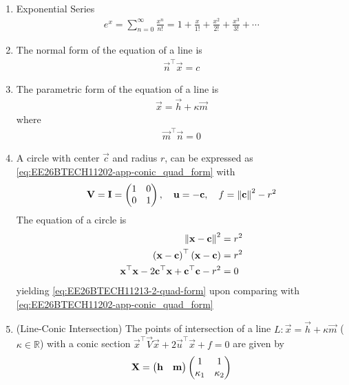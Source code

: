 \begin{enumerate}[label=\thesubsection.\arabic*, ref=\thesubsection.\theenumi,itemsep=0pt]

\item Exponential Series
\begin{align}
e^x = \sum_{n=0}^{\infty} \frac{x^n}{n!} = 1 + \frac{x}{1!} + \frac{x^2}{2!} + \frac{x^3}{3!} + \cdots \label{eq:EE26BTECH11213-exp_maclaurin}
\end{align}
\item The normal form of the equation of a line is 
\begin{align}
	\vec{n}^{\top}
\vec{x} = c
\label{eq:EE26BTECH11213-line-normal}
\end{align}
\item The parametric form of the equation of a line is 
\begin{align}
\vec{x} = \vec{h}+ \kappa \vec{m}
\label{eq:EE26BTECH11213-line-param}
\end{align}
where
\begin{align}
\vec{m}^\top \vec{n} = 0
\end{align}
\item A circle with center $\vec{c}$ and radius $r$, 
	can be expressed as
    \eqref{eq:EE26BTECH11202-app-conic_quad_form}
    with 
\begin{align}
\mathbf{V} = \mathbf{I} = \begin{pmatrix}1 & 0 \\ 0 & 1\end{pmatrix}, \quad \mathbf{u} = -\mathbf{c}, \quad f = \left\lVert\mathbf{c}\right\rVert^2 - r^2 
\label{eq:EE26BTECH11213-2-quad-form}
\end{align}
\solution  The equation of a circle is
\begin{align}
	\left\lVert\mathbf{x} - \mathbf{c}\right\rVert^2 &= r^2
\\
\left(\mathbf{x} - \mathbf{c}\right)^\top \left(\mathbf{x} - \mathbf{c}\right) &= r^2 \\
\mathbf{x}^\top \mathbf{x} - 2\mathbf{c}^\top \mathbf{x} + \mathbf{c}^\top \mathbf{c} - r^2 &= 0
\end{align}
yielding \eqref{eq:EE26BTECH11213-2-quad-form}
upon comparing with 
    \eqref{eq:EE26BTECH11202-app-conic_quad_form}
\item (Line-Conic Intersection) The points of intersection of a line $L: \vec{x} = \vec{h} + \kappa \vec{m}$ ($\kappa \in \mathbb{R}$) with a conic section $\vec{x}^\top \vec{V} \vec{x} + 2\vec{u}^\top \vec{x} + f = 0$ are given by
\begin{align}
\vec{X} = \myvec{\vec{h} & \vec{m}} \myvec{1 & 1 \\ \kappa_1 & \kappa_2} \label{eq:EE26BTECH11213-conic_sol_matrix}

\end{align}
\end{enumerate}
